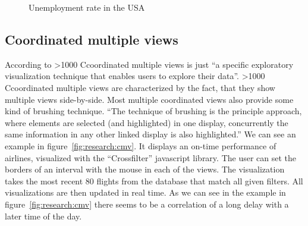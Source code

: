 \documentclass{article}
\newcommand\hmm[1]{\ifnum\ifhmode\spacefactor\else2000\fi>1000 \uppercase{#1}\else#1\fi}
\newcommand{\cmvs}{\hmm{c}oordinated multiple views}
\begin{document}
\begin{figure}[h]
  \centering
  \caption{Unemployment rate in the USA}
  \label{fig:research:choropleth}
\end{figure}


\subsection{Coordinated multiple views}
According to \textcite{Roberts2007} \cmvs{} is just ``a specific exploratory visualization technique that enables users to explore their data''.
\cmvs{} are characterized by the fact, that they show multiple views side-by-side.
Most multiple coordinated views also provide some kind of brushing technique.
``The technique of brushing is the principle approach, where elements are selected (and highlighted) in one display, concurrently the same information in any other linked display is also highlighted.''\cite{Roberts2007}
We can see an example in figure~\ref{fig:research:cmv}.
It displays an on-time performance of airlines, visualized with the ``Crossfilter'' javascript library.
The user can set the borders of an interval with the mouse in each of the views.
The visualization takes the most recent 80 flights from the database that match all given filters.
All visualizations are then updated in real time.
As we can see in the example in figure~\ref{fig:research:cmv} there seems to be a correlation of a long delay with a later time of the day.
\end{document}
